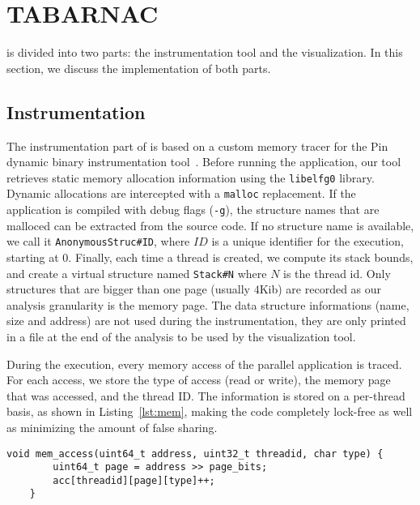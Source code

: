
\section{TABARNAC}
\label{sec:design}

\TABARNAC is divided into two parts: the instrumentation tool and the
visualization.  In this section, we discuss the implementation of both parts.

\subsection{Instrumentation}
\label{sec:design-impl}

The instrumentation part of \TABARNAC is based on a custom memory tracer for the Pin dynamic binary instrumentation tool~\cite{Luk05Pin}.
Before running the application, our tool retrieves static memory allocation
information using the \texttt{libelfg0} library. Dynamic allocations are
intercepted with a \texttt{malloc} replacement. If the application is
compiled with debug flags (\texttt{-g}), the structure names that are malloced can be extracted from the source
code. If no structure name is available, we call it
\texttt{AnonymousStruc\#ID}, where $ID$ is a unique identifier for the
execution, starting at $0$. Finally, each time a thread is created, we compute
its stack bounds, and create a virtual structure named \texttt{Stack\#N} where
$N$ is the thread id. Only structures that are bigger than one page (usually
$4$Kib) are recorded as our
analysis granularity is the memory page. The data structure informations (name,
size and address) are not used during the instrumentation, they are only
printed in a file at the end of the analysis to be used by the visualization
tool.

During the execution, every memory access of the parallel application is traced.
For each access, we store the type of access (read or write), the memory page that was accessed, and the thread ID.
The information is stored on a per-thread basis, as shown in
Listing~\ref{lst:mem}, making the code completely lock-free as well as minimizing the amount of false sharing.

\begin{lstlisting}[caption={Code executed on each memory access. The \texttt{address}, \texttt{threadid} and \texttt{type} parameters are from Pin.},label=lst:mem]
	void mem_access(uint64_t address, uint32_t threadid, char type) {
		uint64_t page = address >> page_bits;
		acc[threadid][page][type]++;
	}

\end{lstlisting}


